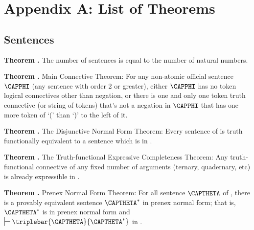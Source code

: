 
\clearemptydoublepage
\chapter*{Appendix A: List of Theorems}
\fancyhead[LE,RO]{\textsf{\thepage}}
\setcounter{section}{0}

\section*{Sentences}

\begin{majorILnc}{\textbf{Theorem .}}
The number of \GSL{} sentences is equal to the number of natural numbers.
\end{majorILnc}

\begin{majorILnc}{\textbf{Theorem .} Main Connective Theorem:} 
For any non-atomic official \GSL{} sentence $\CAPPHI$ (any sentence with order 2 or greater), either $\CAPPHI$ has no token logical connectives other than negation, or there is one and only one token truth connective (or string of tokens) that's not a negation in $\CAPPHI$ that has one more token of `(' than `)' to the left of it.
\end{majorILnc}

\begin{majorILnc}{\textbf{Theorem .} The Disjunctive Normal Form Theorem:}
Every sentence of \GSL{} is truth functionally equivalent to a \GSL{} sentence which is in .
\end{majorILnc}

\begin{majorILnc}{\textbf{Theorem .} The Truth-functional Expressive Completeness Theorem:}
Any truth-functional connective of any fixed number of arguments (ternary, quadernary, etc) is already expressible in \GSL{}.
\end{majorILnc}

\begin{majorILnc}{\textbf{Theorem .} Prenex Normal Form Theorem:}
For all sentence $\CAPTHETA$ of \GQL{}, there is a provably equivalent sentence $\CAPTHETA^*$ in prenex normal form; that is, $\CAPTHETA^*$ is in prenex normal form and $\sststile{}{}\triplebar{\CAPTHETA}{\CAPTHETA^*}$ in \GQD{}.
\end{majorILnc}

